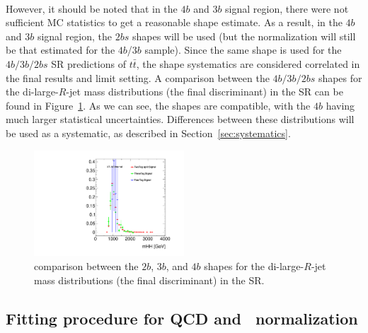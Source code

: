 \paragraph{}
However, it should be noted that in the $4b$ and $3b$ signal region, there were not sufficient MC statistics to get a reasonable shape estimate.  As a result, in the $4b$ and $3b$ signal region,  the $2bs$ shapes will be used (but the normalization will still be that estimated for the $4b$/$3b$ sample). Since the same shape is used for the $4b/3b/2bs$ SR predictions of $t\bar{t}$, the shape systematics are considered correlated in the final results and limit setting. A comparison between the $4b/3b/2bs$ shapes for the di-large-$R$-jet mass distributions (the final discriminant) in the SR can be found in Figure~\ref{fig:ttshapeComp}.  As we can see, the shapes are compatible, with the $4b$ having much larger statistical uncertainties.  Differences between these distributions will be used as a systematic, as described in Section~\ref{sec:systematics}.

\begin{figure}[htbp!]
\begin{center}
  \includegraphics[angle=270, width=0.5\textwidth]{figures/boosted/Other/ttbar_compare_mHH_l.pdf}
\caption{comparison between the $2b$, $3b$, and $4b$ shapes for the di-large-$R$-jet mass distributions (the final discriminant) in the SR.}
\label{fig:ttshapeComp}
\end{center}
\end{figure}


\pagebreak{}
\subsection{Fitting procedure for QCD and \ttbar\ normalization}
\label{sec:ttbarnorm}

